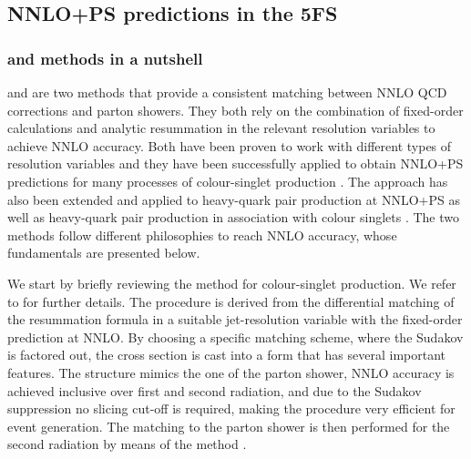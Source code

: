 \documentclass[11pt,a4paper]{article}
\begin{document}
\subsection{NNLO+PS predictions in the 5FS}\label{sec:5FSNNLOPS}
\subsubsection{\minnlo{} and \GENEVA{}  methods in a nutshell}\label{sec:nutshell}

\minnlo{} \cite{Monni:2019whf,Monni:2020nks} and \GENEVA{} \cite{Alioli:2012fc,Alioli:2013hqa} are two methods that provide a consistent matching
between NNLO QCD corrections and parton showers. They both rely on the
combination of fixed-order calculations and analytic resummation
in the relevant resolution variables to achieve NNLO accuracy.
Both have been proven to work with different types of resolution variables \cite{alioli:2021qbf,Gavardi:2023aco,Ebert:2024zdj,Gavardi:2025zpf}
and they have been successfully applied to obtain NNLO+PS predictions for many processes of colour-singlet production \cite{Lombardi:2020wju,Lombardi:2021rvg,Buonocore:2021fnj,Lombardi:2021wug,Zanoli:2021iyp,Gavardi:2022ixt,Haisch:2022nwz,Lindert:2022qdd,Niggetiedt:2024nmp,Biello:2024vdh,Alioli:2015toa,Alioli:2019qzz,Alioli:2020qrd,alioli:2021qbf,Alioli:2021egp,Alioli:2022dkj,Alioli:2023har,Gavardi:2023aco,Gavardi:2025zpf,Alioli:2025xcu}.
The \minnlo{} approach has also been extended and applied to heavy-quark pair production at NNLO+PS \cite{mazzitelli:2020jio,mazzitelli:2021mmm,Mazzitelli:2023znt}
as well as heavy-quark pair production in association with colour singlets \cite{mazzitelli:2024ura,Biello:2024pgo}.
The two methods follow different philosophies to reach NNLO accuracy, whose fundamentals are presented below.

We start by briefly reviewing the \minnlo{} method for colour-singlet production. We refer to  
for further details. The \minnlo{} procedure is derived from the differential matching of the resummation 
formula in a suitable jet-resolution variable with the fixed-order prediction at NNLO.
By choosing a specific matching scheme, where the Sudakov is factored out, the 
cross section is cast into a form that has several important features. The structure
mimics the one of the parton shower, NNLO accuracy is achieved inclusive over
first and second radiation, and due to the Sudakov suppression no slicing cut-off
is required, making the procedure very efficient for event generation.
The matching to the parton shower is then performed for the second radiation
by means of the \POWHEG{} method \cite{frixione:2007vw}.
\end{document}

